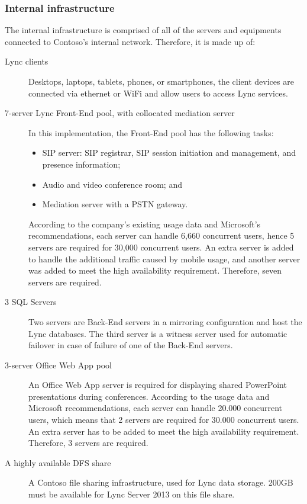 	\subsubsection{Internal infrastructure}
	The internal infrastructure is comprised of all of the servers and equipments connected to Contoso's internal network.
	Therefore, it is made up of:
	\begin{description}
		\item[Lync clients] Desktops, laptops, tablets, phones, or smartphones, the client devices are connected via ethernet or WiFi and allow users to access Lync services.
		
		\item[7-server Lync Front-End pool, with collocated mediation server] In this implementation, the Front-End pool has the following tasks:
			\begin{itemize}
				\item SIP server: SIP registrar, SIP  session initiation and management,  and presence information;
				\item Audio and video conference room; and
				\item Mediation server with a PSTN gateway.
			\end{itemize}
		According to the company's existing usage data and Microsoft's recommendations, each server can handle 6,660 concurrent users, hence 5 servers are required for 30,000 concurrent users. An extra server is added to handle the additional traffic caused by mobile usage, and another server was added  to meet the high availability requirement. Therefore, seven servers are required.
		
		
		\item[3 SQL Servers] Two servers are Back-End servers in a mirroring configuration and host the Lync databases. The third server is a witness server used for automatic failover in case of failure of one of the Back-End servers.
		
		
		\item[3-server Office Web App pool] An Office Web App server is required for displaying shared PowerPoint presentations during conferences.
		According to the usage data and Microsoft recommendations, each server can handle 20.000 concurrent users, which means that 2 servers are required for 30.000 concurrent users. An extra server has to be added to meet the high availability requirement. Therefore, 3 servers are required.
		
		\item[A highly available DFS share] A Contoso file sharing infrastructure, used for Lync data storage. 200GB must be available for Lync Server 2013 on this file share.
		

\end{description}
